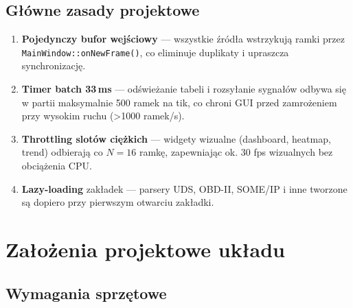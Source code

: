 \documentclass[12pt, a4paper]{article}
\begin{document}
\subsection{Główne zasady projektowe}

\begin{enumerate}
  \item \textbf{Pojedynczy bufor wejściowy} --- wszystkie źródła wstrzykują
        ramki przez \texttt{MainWindow::}\linebreak[0]\texttt{onNewFrame()}, co eliminuje
        duplikaty i upraszcza synchronizację.
  \item \textbf{Timer batch 33\,ms} --- odświeżanie tabeli i rozsyłanie
        sygnałów odbywa się w partii maksymalnie 500 ramek na tik,
        co chroni GUI przed zamrożeniem przy wysokim ruchu (>1000 ramek/s).
  \item \textbf{Throttling slotów ciężkich} --- widgety wizualne
        (dashboard, heatmap, trend) odbierają co \(N=16\) ramkę,
        zapewniając ok. 30 fps wizualnych bez obciążenia CPU.
  \item \textbf{Lazy-loading} zakładek --- parsery UDS, OBD-II, SOME/IP
        i inne tworzone są dopiero przy pierwszym otwarciu zakładki.
\end{enumerate}

\section{Założenia projektowe układu}

\subsection{Wymagania sprzętowe}
\end{document}
